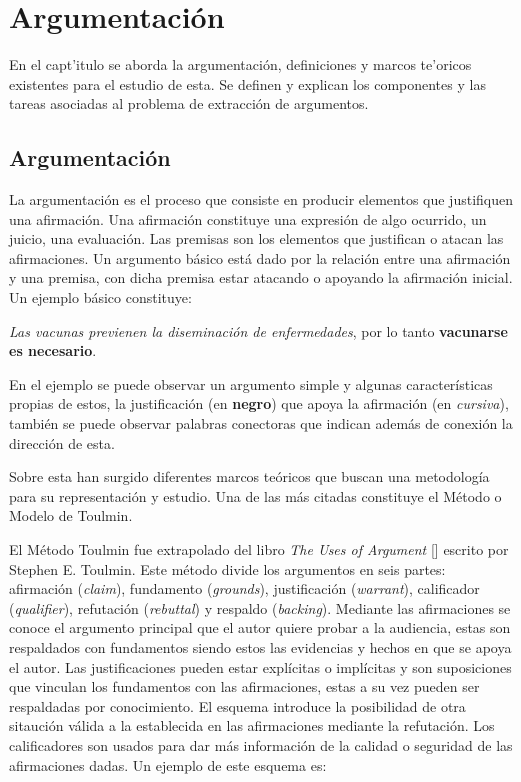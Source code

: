 \chapter{Argumentación}\label{chapter:argumentation}


En el capt'itulo se aborda la argumentación, definiciones y marcos te'oricos existentes para el estudio de esta.
Se definen y explican los componentes y las tareas asociadas al problema de extracción de argumentos.  

\section{Argumentación}


La argumentación es el proceso que consiste en producir elementos que justifiquen una afirmación. Una afirmación 
constituye una expresión de algo ocurrido, un juicio, una evaluación. Las premisas son los elementos que 
justifican o atacan las afirmaciones. Un argumento básico está dado por la relación entre una afirmación y una 
premisa, con dicha premisa estar atacando o apoyando la afirmación inicial. Un ejemplo básico constituye:

\begin{adjustwidth}{25pt}{25pt}
    \emph{Las vacunas previenen la diseminación de enfermedades}, por lo tanto \textbf{vacunarse es necesario}.
\end{adjustwidth}

En el ejemplo se puede observar un argumento simple y algunas características propias de estos, la justificación 
(en \textbf{negro}) que apoya la afirmación (en \emph{cursiva}), también se puede observar palabras conectoras 
que indican además de conexión la dirección de esta.

Sobre esta han surgido diferentes marcos teóricos que buscan una metodología para su representación y estudio. 
Una de las más citadas constituye el Método o Modelo de Toulmin.

El Método Toulmin fue extrapolado del libro \emph{The Uses of Argument} [\cite{toulmin_2003}] escrito por Stephen E. Toulmin.
Este método divide los argumentos en seis partes: afirmación (\emph{claim}), fundamento (\emph{grounds}), 
justificación (\emph{warrant}), calificador (\emph{qualifier}), refutación (\emph{rebuttal}) y respaldo (\emph{backing}).
Mediante las afirmaciones se conoce el argumento principal que el autor quiere probar a la audiencia,
estas son respaldados con fundamentos siendo estos las evidencias y hechos en que se apoya el autor.
Las justificaciones pueden estar explícitas o implícitas y son suposiciones que vinculan los
fundamentos con las afirmaciones, estas a su vez pueden ser respaldadas por conocimiento.
El esquema introduce la posibilidad de otra sitaución válida a la establecida en las afirmaciones
mediante la refutación. Los calificadores son usados para dar más información de la calidad o seguridad
de las afirmaciones dadas. Un ejemplo de este esquema es:

